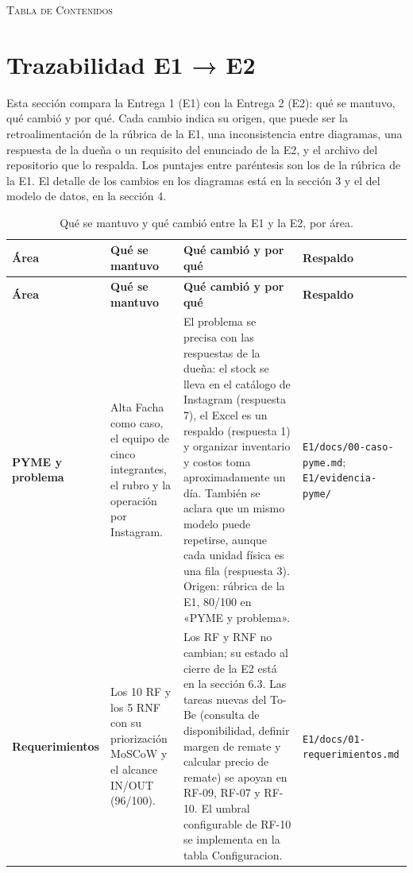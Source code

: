 \documentclass[11pt,letterpaper]{article}
\makeatletter
\def\tableofcontents{%
 \newpage
 \centerline{\large\scshape Tabla de Contenidos}
 \vspace*{0.3in}
 \@mkboth{CONTENTS}{CONTENTS}
 \@starttoc{toc}
}
\makeatother
\begin{document}
\tableofcontents
\clearpage

\section{Trazabilidad E1 → E2}

Esta sección compara la Entrega 1 (E1) con la Entrega 2 (E2): qué se mantuvo, qué cambió y por qué. Cada cambio indica su origen, que puede ser la retroalimentación de la rúbrica de la E1, una inconsistencia entre diagramas, una respuesta de la dueña o un requisito del enunciado de la E2, y el archivo del repositorio que lo respalda. Los puntajes entre paréntesis son los de la rúbrica de la E1. El detalle de los cambios en los diagramas está en la sección 3 y el del modelo de datos, en la sección 4.
{\scriptsize
\setlength{\tabcolsep}{3pt}\renewcommand{\arraystretch}{1.15}
\begin{longtable}{>{\raggedright\arraybackslash}p{}>{\raggedright\arraybackslash}p{}>{\raggedright\arraybackslash}p{}>{\raggedright\arraybackslash}p{}}
\caption{Qué se mantuvo y qué cambió entre la E1 y la E2, por área.}\\
\hline
\rowcolor[HTML]{D9EAF7}\textbf{\textbf{Área}} & \textbf{\textbf{Qué se mantuvo}} & \textbf{\textbf{Qué cambió y por qué}} & \textbf{\textbf{Respaldo}} \\
\hline
\endfirsthead
\hline
\rowcolor[HTML]{D9EAF7}\textbf{\textbf{Área}} & \textbf{\textbf{Qué se mantuvo}} & \textbf{\textbf{Qué cambió y por qué}} & \textbf{\textbf{Respaldo}} \\
\hline
\endhead
\textbf{PYME y problema} & Alta Facha como caso, el equipo de cinco integrantes, el rubro y la operación por Instagram. & El problema se precisa con las respuestas de la dueña: el stock se lleva en el catálogo de Instagram (respuesta 7), el Excel es un respaldo (respuesta 1) y organizar inventario y costos toma aproximadamente un día. También se aclara que un mismo modelo puede repetirse, aunque cada unidad física es una fila (respuesta 3). Origen: rúbrica de la E1, 80/100 en «PYME y problema». & \texttt{E1/\allowbreak{}docs/\allowbreak{}00-caso-pyme.md}; \texttt{E1/\allowbreak{}evidencia-pyme/\allowbreak{}} \\
\hline
\textbf{Requerimientos} & Los 10 RF y los 5 RNF con su priorización MoSCoW y el alcance IN/OUT (96/100). & Los RF y RNF no cambian; su estado al cierre de la E2 está en la sección 6.3. Las tareas nuevas del To-Be (consulta de disponibilidad, definir margen de remate y calcular precio de remate) se apoyan en RF-09, RF-07 y RF-10. El umbral configurable de RF-10 se implementa en la tabla Configuracion. & \texttt{E1/\allowbreak{}docs/\allowbreak{}01-requerimientos.md} \\

\end{longtable}}
\end{document}
